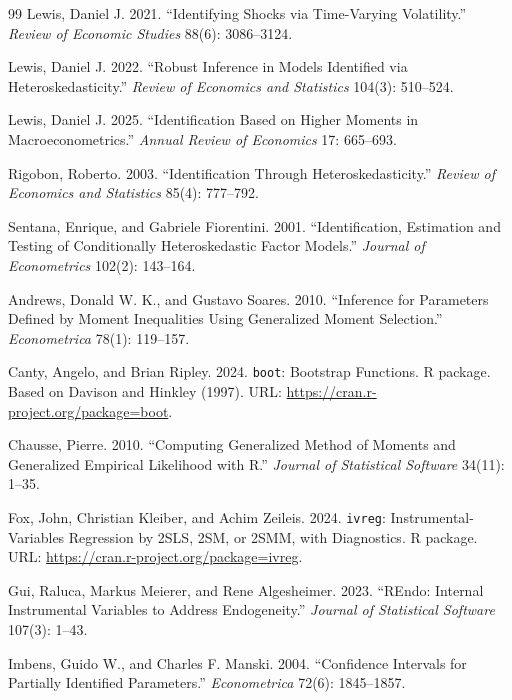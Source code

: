 \documentclass[11pt]{article}
\theoremstyle{plain}
\theoremstyle{definition}
\theoremstyle{remark}
\begin{document}
\begin{thebibliography}{99}
Lewis, Daniel J. 2021. ``Identifying Shocks via Time-Varying Volatility.''
\emph{Review of Economic Studies} 88(6): 3086--3124.

Lewis, Daniel J. 2022. ``Robust Inference in Models Identified via
Heteroskedasticity.'' \emph{Review of Economics and Statistics} 104(3): 510--524.

Lewis, Daniel J. 2025. ``Identification Based on Higher Moments in
Macroeconometrics.'' \emph{Annual Review of Economics} 17: 665--693.

Rigobon, Roberto. 2003. ``Identification Through Heteroskedasticity.''
\emph{Review of Economics and Statistics} 85(4): 777--792.

Sentana, Enrique, and Gabriele Fiorentini. 2001. ``Identification, Estimation and
Testing of Conditionally Heteroskedastic Factor Models.'' \emph{Journal of
Econometrics} 102(2): 143--164.



Andrews, Donald W. K., and Gustavo Soares. 2010. ``Inference for Parameters
Defined by Moment Inequalities Using Generalized Moment Selection.''
\emph{Econometrica} 78(1): 119--157.

Canty, Angelo, and Brian Ripley. 2024. \texttt{boot}: Bootstrap Functions.
R package.  Based on Davison and Hinkley (1997).  URL:
\url{https://cran.r-project.org/package=boot}.

Chausse, Pierre. 2010. ``Computing Generalized Method of Moments and Generalized
Empirical Likelihood with R.'' \emph{Journal of Statistical Software} 34(11):
1--35.

Fox, John, Christian Kleiber, and Achim Zeileis. 2024. \texttt{ivreg}:
Instrumental-Variables Regression by 2SLS, 2SM, or 2SMM, with Diagnostics. R
package. URL: \url{https://cran.r-project.org/package=ivreg}.

Gui, Raluca, Markus Meierer, and Rene Algesheimer. 2023. ``REndo: Internal
Instrumental Variables to Address Endogeneity.'' \emph{Journal of Statistical
Software} 107(3): 1--43.

Imbens, Guido W., and Charles F. Manski. 2004. ``Confidence Intervals for
Partially Identified Parameters.'' \emph{Econometrica} 72(6): 1845--1857.


\end{thebibliography}
\end{document}
